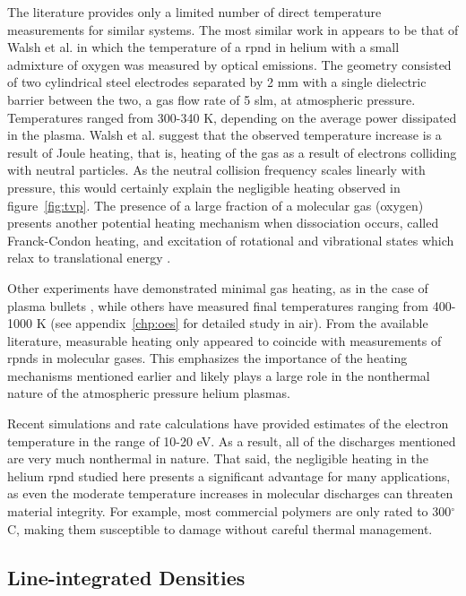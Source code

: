 The literature provides only a limited number of direct temperature measurements
for similar systems. The most similar work in appears to be that of Walsh et al.
\cite{Walsh2010} in which the temperature of a \acs{rpnd} in helium with a small
admixture of oxygen was measured by optical emissions. The geometry consisted of
two cylindrical steel electrodes separated by 2 mm with a single dielectric
barrier between the two, a gas flow rate of 5 slm, at atmospheric pressure.
Temperatures ranged from 300-340 K, depending on the average power dissipated in
the plasma. Walsh et al. suggest that the observed temperature increase is a
result of Joule heating, that is, heating of the gas as a result of electrons
colliding with neutral particles. As the neutral collision frequency scales
linearly with pressure, this would certainly explain the negligible heating
observed in figure~\ref{fig:tvp}. The presence of a large fraction of a
molecular gas (oxygen) presents another potential heating mechanism when
dissociation occurs, called Franck-Condon heating, and excitation of rotational
and vibrational states which relax to translational energy
\cite{Kiehlbauch2003}.

Other experiments have demonstrated minimal gas heating, as in the case of
plasma bullets \cite{Laroussi2005, Lu2006}, while others have measured final
temperatures ranging from 400-1000 K \cite{Pai2009, Popov2011, Zuzeek2010} (see
appendix~\ref{chp:oes} for detailed study in air). From the available
literature, measurable heating only appeared to coincide with measurements of
\acs{rpnd}s in molecular gases. This emphasizes the importance of the heating
mechanisms mentioned earlier and likely plays a large role in the nonthermal
nature of the atmospheric pressure helium plasmas.

Recent simulations and rate calculations \cite{Takashima2011, Aleksandrov2007}
have provided estimates of the electron temperature in the range of 10-20 eV. As
a result, all of the discharges mentioned are very much nonthermal in nature.
That said, the negligible heating in the helium \acs{rpnd} studied here presents
a significant advantage for many applications, as even the moderate temperature
increases in molecular discharges can threaten material integrity. For example,
most commercial polymers are only rated to 300$^\circ$ C, making them
susceptible to damage without careful thermal management.

\subsection{Line-integrated Densities}


